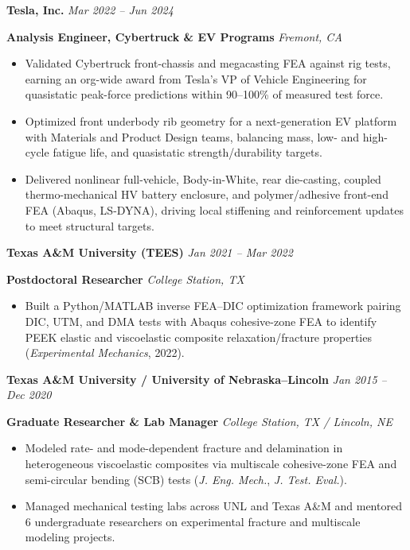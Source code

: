 \documentclass[10pt,letterpaper]{article}
\newcommand{\roleheader}[4]{%
  \vspace{3.5pt}
  \noindent\textbf{#1} \hfill \textit{#4}\par
  \noindent\textbf{#2} \hfill \textit{#3}\par
  \vspace{1.2pt}
}
\begin{document}
\roleheader{Tesla, Inc.}{Analysis Engineer, Cybertruck \& EV Programs}{Fremont, CA}{Mar 2022 -- Jun 2024}
\begin{itemize}
  \item Validated Cybertruck front-chassis and megacasting FEA against rig tests, earning an org-wide award from Tesla's VP of Vehicle Engineering for quasistatic peak-force predictions within 90--100\% of measured test force.
  \item Optimized front underbody rib geometry for a next-generation EV platform with Materials and Product Design teams, balancing mass, low- and high-cycle fatigue life, and quasistatic strength/durability targets.
  \item Delivered nonlinear full-vehicle, Body-in-White, rear die-casting, coupled thermo-mechanical HV battery enclosure, and polymer/adhesive front-end FEA (Abaqus, LS-DYNA), driving local stiffening and reinforcement updates to meet structural targets.
\end{itemize}

\roleheader{Texas A\&M University (TEES)}{Postdoctoral Researcher}{College Station, TX}{Jan 2021 -- Mar 2022}
\begin{itemize}
  \item Built a Python/MATLAB inverse FEA--DIC optimization framework pairing DIC, UTM, and DMA tests with Abaqus cohesive-zone FEA to identify PEEK elastic and viscoelastic composite relaxation/fracture properties (\textit{Experimental Mechanics}, 2022).
\end{itemize}

\roleheader{Texas A\&M University / University of Nebraska--Lincoln}{Graduate Researcher \& Lab Manager}{College Station, TX / Lincoln, NE}{Jan 2015 -- Dec 2020}
\begin{itemize}
  \item Modeled rate- and mode-dependent fracture and delamination in heterogeneous viscoelastic composites via multiscale cohesive-zone FEA and semi-circular bending (SCB) tests (\textit{J. Eng. Mech.}, \textit{J. Test. Eval.}).
  \item Managed mechanical testing labs across UNL and Texas A\&M and mentored 6 undergraduate researchers on experimental fracture and multiscale modeling projects.
\end{itemize}

\end{document}
